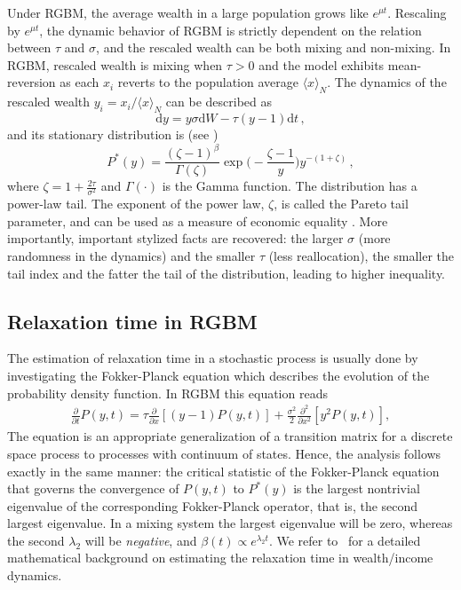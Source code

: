 \documentclass[11pt]{article}
\newcommand{\be}{\begin{equation}}
\newcommand{\ee}{\end{equation}}
\numberwithin{equation}{section}
\begin{document}
Under RGBM, the average wealth in a large population grows like $e^{\mu t}$. Rescaling by $e^{\mu t}$, the dynamic behavior of RGBM is strictly dependent on the relation between $\tau$ and $\sigma$, and the rescaled wealth can be both mixing and non-mixing. In RGBM, rescaled wealth is mixing when $\tau > 0$
and the model exhibits mean-reversion as each $x_i$ reverts to the population average $\langle x \rangle_N$. The dynamics of the rescaled wealth $y_i = x_i / \langle x \rangle_N$ can be described as
%
\be
    \mathrm{d} y =   y \sigma  \mathrm{d} W - \tau (y - 1)  \mathrm{d}t\,,
    \label{eq:rescaled-rgbm}
\ee
%
and its stationary distribution is (see \citep{BermanPetersAdamou2019})
%
\be
P^*(y) = \frac{(\zeta - 1)^{\beta}}{\Gamma(\zeta)} \exp{\big(-\frac{\zeta - 1}{y}\big)} y^{-(1+\zeta)}\,,
\label{eq:rgbm-stationary-distribution}
\ee
%
where $\zeta = 1 + \frac{2 \tau}{\sigma^2}$ and $\Gamma(\cdot)$ is the Gamma function. The distribution has a power-law tail. The exponent of the power law, $\zeta$, is called the Pareto tail parameter, and can be used as a measure of economic equality \citep{Cowell2011}. More importantly, important stylized facts are recovered: the larger $\sigma$ (more randomness in the dynamics) and the smaller $\tau$ (less reallocation), the smaller the tail index and the fatter the tail of the distribution, leading to higher inequality.

\subsection{Relaxation time in RGBM}
\label{sec:relax-time-rgbm}
The estimation of relaxation time in a stochastic process is usually done by investigating the Fokker-Planck equation which describes the evolution of the probability density function. In RGBM this equation reads
\begin{align}
       \frac{\partial}{\partial t}P(y,t)= \tau \frac{\partial}{\partial x} \left[(y-1) P(y,t)\right] + \frac{\sigma^2}{2}\frac{\partial^2}{\partial x^2} \left[ y^2 P(y,t) \right],
\end{align}
The equation is an appropriate generalization of a transition matrix for a discrete space process to processes with continuum of states. Hence, the analysis follows exactly in the same manner: the critical statistic of the Fokker-Planck equation that governs the convergence of $P(y,t)$ to $P^*(y)$ is the largest nontrivial
eigenvalue of the corresponding Fokker-Planck operator, that is, the second largest eigenvalue. In a mixing system the largest eigenvalue will be zero, whereas the second $\lambda_2$ will be \textit{negative}, and $\beta(t) \propto e^{\lambda_2 t}$. We refer to~\cite{gabaix2016dynamics} for a detailed mathematical background on estimating the relaxation time in wealth/income dynamics. 
\end{document}
